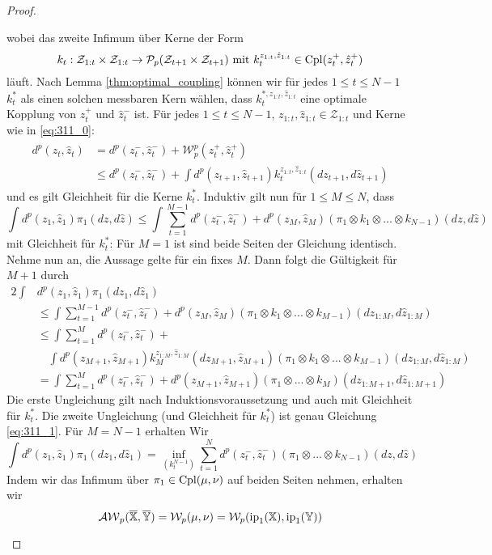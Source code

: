 \begin{proof}
\begin{enumerate}
wobei das zweite Infimum über Kerne der Form
\begin{equation}\label{eq:311_0}
k_t: \mathcal{Z}_{1:t}\times \mathcal{Z}_{1:t} \rightarrow \mathcal{P}_p(\mathcal{Z}_{t+1}\times \mathcal{Z}_{t+1}) \text{ mit } k_t^{z_{1:t}, \hat{z}_{1:t}} \in \operatorname{Cpl}(z_t^+, \hat{z}_t^+)
\end{equation}
läuft. Nach Lemma \ref{thm:optimal_coupling} können wir für jedes $1 \leq t \leq N-1$ $k_t^*$ als einen solchen messbaren Kern wählen, dass $k_t^{*, z_{1:t}, \hat{z}_{1:t}}$ eine optimale Kopplung von $z_t^+$ und $\hat{z}_t^-$ ist. Für jedes $1\leq t\leq N-1$, $z_{1:t}, \hat{z}_{1:t} \in \mathcal{Z}_{1:t}$ und Kerne wie in \ref{eq:311_0}:
\begin{align}\label{eq:311_1}
    \begin{split}
    d^p(z_t, \hat{z}_t) &= d^p(z_t^-, \hat{z}_t^-) + \mathcal{W}_p^p(z_t^+, \hat{z}_t^+) \\
    &\leq d^p(z_t^-, \hat{z}_t^-) + \int d^p(z_{t+1}, \hat{z}_{t+1}) k_t^{z_{1:t}, \hat{z}_{1:t}}(dz_{t+1}, d\hat{z}_{t+1})
    \end{split}
\end{align}
und es gilt Gleichheit für die Kerne $k_t^*$. Induktiv gilt nun für $1 \leq M \leq N$, dass
$$\int d^p(z_1, \hat{z}_1)\pi_1(dz, d\hat{z}) \leq \int \sum_{t=1}^{M-1} d^p(z_t^-, \hat{z}_t^-) +d^p(z_M, \hat{z}_M)(\pi_1 \otimes k_1 \otimes ... \otimes k_{N-1})(dz, d\hat{z})$$
mit Gleichheit für $k_t^*$: Für $M=1$ ist sind beide Seiten der Gleichung identisch. Nehme nun an, die Aussage gelte für ein fixes $M$. Dann folgt die Gültigkeit für $M+1$ durch
\begin{alignat*}{2}
\int &d^p(z_1, \hat{z}_1)\pi_1(dz_1, d\hat{z}_1) \\
&\leq \int \sum_{t=1}^{M-1} d^p(z_t^-, \hat{z}_t^-) +d^p(z_M, \hat{z}_M)(\pi_1 \otimes k_1 \otimes ... \otimes k_{M-1})(dz_{1:M}, d\hat{z}_{1:M}) \\
&\leq\int \sum_{t=1}^{M}d^p(z_t^-, \hat{z}_t^-) + \\
    &\quad\int d^p(z_{M+1}, \hat{z}_{M+1}) k_M^{z_{1:M}, \hat{z}_{1:M}}(dz_{M+1}, \hat{z}_{M+1}) (\pi_1 \otimes k_1 \otimes ... \otimes k_{M-1})(dz_{1:M}, d\hat{z}_{1:M})\\
&= \int \sum_{t=1}^{M}d^p(z_t^-, \hat{z}_t^-) + d^p(z_{M+1}, \hat{z}_{M+1})(\pi_1 \otimes ...\otimes k_M)(dz_{1:M+1}, d\hat{z}_{1:M+1})
\end{alignat*}
Die erste Ungleichung gilt nach Induktionsvoraussetzung und auch mit Gleichheit für $k_t^*$. Die zweite Ungleichung (und Gleichheit für $k_t^*$) ist genau Gleichung \ref{eq:311_1}.
Für $M=N-1$ erhalten Wir
$$\int d^p(z_1, \hat{z}_1)\pi_1(dz_1, d\hat{z}_1) = \inf_{(k_t^{N-1})} \sum_{t=1}^Nd^p(z_t^-, \hat{z}_t^-)(\pi_1 \otimes ... \otimes k_{N-1})(dz, d\hat{z})$$
Indem wir das Infimum über $\pi_1 \in \operatorname{Cpl}(\mu, \nu)$ auf beiden Seiten nehmen, erhalten wir
$$\mathcal{AW}_p(\overline{\mathbb{X}}, \overline{\mathbb{Y}}) = \mathcal{W}_p(\mu, \nu) = \mathcal{W}_p(\operatorname{ip}_1(\mathbb{X}), \operatorname{ip}_1(\mathbb{Y}))$$
\end{enumerate}
\end{proof}